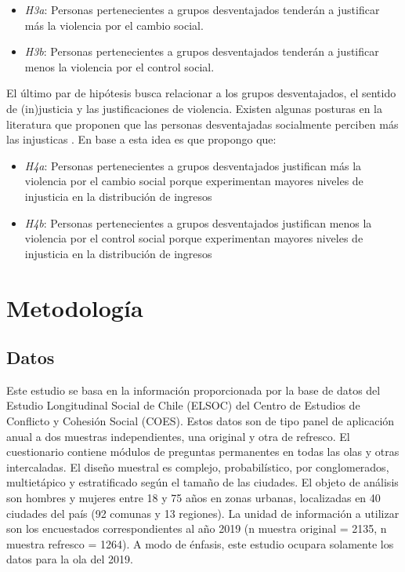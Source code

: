 \documentclass[12pt,twoside]{templates/facsothesis}
\providecommand{\tightlist}{%
  \setlength{\itemsep}{0pt}\setlength{\parskip}{0pt}}
\begin{document}
\begin{itemize}
\tightlist
\item
  \emph{H3a}: Personas pertenecientes a grupos desventajados tenderán a justificar más la violencia por el cambio social.
\item
  \emph{H3b}: Personas pertenecientes a grupos desventajados tenderán a justificar menos la violencia por el control social.
\end{itemize}

El último par de hipótesis busca relacionar a los grupos desventajados, el sentido de (in)justicia y las justificaciones de violencia. Existen algunas posturas en la literatura que proponen que las personas desventajadas socialmente perciben más las injusticas \citep{Resh2010}. En base a esta idea es que propongo que:

\begin{itemize}
\tightlist
\item
  \emph{H4a}: Personas pertenecientes a grupos desventajados justifican más la violencia por el cambio social porque experimentan mayores niveles de injusticia en la distribución de ingresos
\item
  \emph{H4b}: Personas pertenecientes a grupos desventajados justifican menos la violencia por el control social porque experimentan mayores niveles de injusticia en la distribución de ingresos
\end{itemize}

\hypertarget{metodologuxeda}{%
\chapter{Metodología}\label{metodologuxeda}}

\hypertarget{datos}{%
\section{Datos}\label{datos}}

Este estudio se basa en la información proporcionada por la base de datos del Estudio Longitudinal Social de Chile (ELSOC) del Centro de Estudios de Conflicto y Cohesión Social (COES). Estos datos son de tipo panel de aplicación anual a dos muestras independientes, una original y otra de refresco. El cuestionario contiene módulos de preguntas permanentes en todas las olas y otras intercaladas. El diseño muestral es complejo, probabilístico, por conglomerados, multietápico y estratificado según el tamaño de las ciudades. El objeto de análisis son hombres y mujeres entre 18 y 75 años en zonas urbanas, localizadas en 40 ciudades del país (92 comunas y 13 regiones). La unidad de información a utilizar son los encuestados correspondientes al año 2019 (n muestra original = 2135, n muestra refresco = 1264). A modo de énfasis, este estudio ocupara solamente los datos para la ola del 2019.
\end{document}
